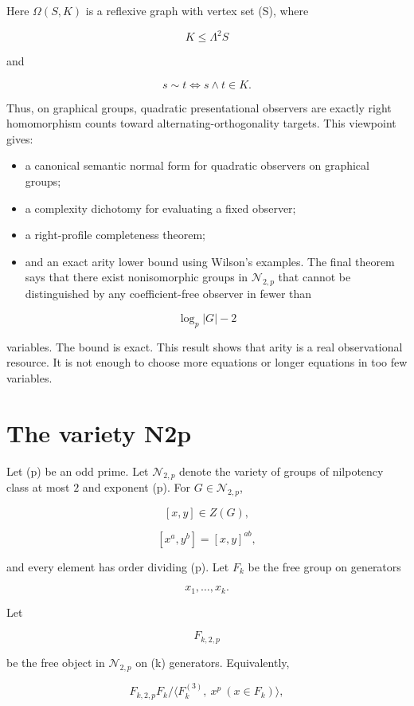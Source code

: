 \documentclass[11pt]{article}
\begin{document}
Here $\Omega(S,K)$ is a reflexive graph with vertex set (S), where

\[
K\le \Lambda^2S
\]

and

\[
s\sim t
\iff s\wedge t\in K.
\]

Thus, on graphical groups, quadratic presentational observers are exactly right homomorphism counts toward alternating-orthogonality targets. This viewpoint gives:

\begin{itemize}
\item a canonical semantic normal form for quadratic observers on graphical groups;
\item a complexity dichotomy for evaluating a fixed observer;
\item a right-profile completeness theorem;
\item and an exact arity lower bound using Wilson's examples.
The final theorem says that there exist nonisomorphic groups in $\mathcal N_{2,p}$ that cannot be distinguished by any coefficient-free observer in fewer than

\end{itemize}

\[
\log_p|G|-2
\]

variables. The bound is exact. This result shows that arity is a real observational resource. It is not enough to choose more equations or longer equations in too few variables.

\section{The variety N2p}

Let (p) be an odd prime. Let $\mathcal N_{2,p}$ denote the variety of groups of nilpotency class at most $2$ and exponent (p). For $G\in\mathcal N_{2,p}$,

\[
[x,y]\in Z(G),
\]

\[
[x^a,y^b]=[x,y]^{ab},
\]

and every element has order dividing (p). Let $F_k$ be the free group on generators

\[
x_1,\dots,x_k.
\]

Let

\[
F_{k,2,p}
\]

be the free object in $\mathcal N_{2,p}$ on (k) generators. Equivalently,

\[
F_{k,2,p}
F_k/
\langle
F_k^{(3)},\ x^p\ (x\in F_k)
\rangle,
\]
\end{document}
